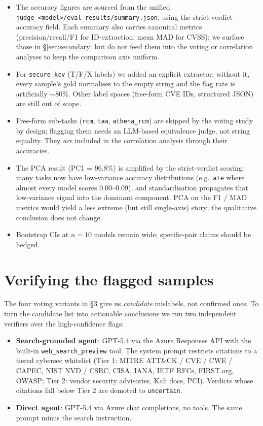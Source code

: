 \documentclass[10pt,a4paper]{article}
\begin{document}
\begin{itemize}
\item The accuracy figures are sourced from the unified \texttt{judge\_<model>/eval\_results/summary.json}, using the strict-verdict accuracy field. Each summary also carries canonical metrics (precision/recall/F1 for ID-extraction; mean MAD for CVSS); we surface those in \S\ref{sec:secondary} but do not feed them into the voting or correlation analyses to keep the comparison axis uniform.
\item For \texttt{secure\_kcv} (T/F/X labels) we added an explicit extractor; without it, every sample's gold normalises to the empty string and the flag rate is artificially $\sim$80\%. Other label spaces (free-form CVE IDs, structured JSON) are still out of scope.
\item Free-form sub-tasks (\texttt{rcm}, \texttt{taa}, \texttt{athena\_rcm}) are skipped by the voting study by design; flagging them needs an LLM-based equivalence judge, not string equality. They \emph{are} included in the correlation analysis through their accuracies.
\item The PCA result (PC1 = 96.8\%) is amplified by the strict-verdict scoring: many tasks now have low-variance accuracy distributions (e.g.\ \texttt{ate} where almost every model scores 0.00--0.09), and standardisation propagates that low-variance signal into the dominant component. PCA on the F1 / MAD metrics would yield a less extreme (but still single-axis) story; the qualitative conclusion does not change.
\item Bootstrap CIs at $n=10$ models remain wide; specific-pair claims should be hedged.
\end{itemize}

\section{Verifying the flagged samples}\label{sec:verify}

The four voting variants in \S3 give us \emph{candidate} mislabels, not confirmed ones. To turn the candidate list into actionable conclusions we run two independent verifiers over the high-confidence flags:

\begin{itemize}
\item \textbf{Search-grounded agent}: GPT-5.4 via the Azure Responses API with the built-in \texttt{web\_search\_preview} tool. The system prompt restricts citations to a tiered cybersec whitelist (Tier 1: MITRE ATT\&CK / CVE / CWE / CAPEC, NIST NVD / CSRC, CISA, IANA, IETF RFCs, FIRST.org, OWASP; Tier 2: vendor security advisories, Kali docs, PCI). Verdicts whose citations fall below Tier 2 are demoted to \texttt{uncertain}.
\item \textbf{Direct agent}: GPT-5.4 via Azure chat completions, no tools. The same prompt minus the search instruction.
\end{itemize}
\end{document}
